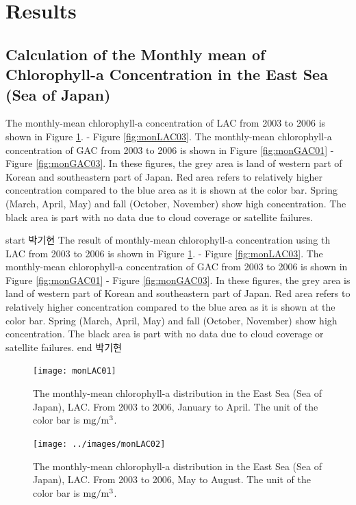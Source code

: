 \section{Results}

\subsection{Calculation of the Monthly mean of Chlorophyll-a Concentration in the East Sea (Sea of Japan)}

The monthly-mean chlorophyll-a concentration of LAC from 2003 to 2006 is shown in Figure \ref{fig:monLAC01}. - Figure \ref{fig:monLAC03}. The monthly-mean chlorophyll-a concentration of GAC from 2003 to 2006 is shown in Figure \ref{fig:monGAC01} - Figure \ref{fig:monGAC03}. In these figures, the grey area is land of western part of Korean and southeastern part of Japan. Red area refers to relatively higher concentration compared to the blue area as it is shown at the color bar. Spring (March, April, May) and fall (October, November) show high concentration. The black area is part with no data due to cloud coverage or satellite failures. 

start 박기현
The result of monthly-mean chlorophyll-a concentration using th  LAC from 2003 to 2006 is shown in Figure \ref{fig:monLAC01}. - Figure \ref{fig:monLAC03}. The monthly-mean chlorophyll-a concentration of GAC from 2003 to 2006 is shown in Figure \ref{fig:monGAC01} - Figure \ref{fig:monGAC03}. In these figures, the grey area is land of western part of Korean and southeastern part of Japan. Red area refers to relatively higher concentration compared to the blue area as it is shown at the color bar. Spring (March, April, May) and fall (October, November) show high concentration. The black area is part with no data due to cloud coverage or satellite failures. 
end 박기현

\begin{figure}[p]
	\centering
	\texttt{[image: monLAC01]}\\
	\caption{The monthly-mean chlorophyll-a distribution in the East Sea (Sea of Japan), LAC. From 2003 to 2006, January to April. The unit of the color bar is $\rm mg/m^3$.}
	\label{fig:monLAC01}
\end{figure}


\begin{figure}[p]
	\centering
	\texttt{[image: ../images/monLAC02]}\\
	\caption{The monthly-mean chlorophyll-a distribution in the East Sea (Sea of Japan), LAC. From 2003 to 2006, May to August. The unit of the color bar is $\rm mg/m^3$.}
	\label{fig:monLAC02}
\end{figure}

